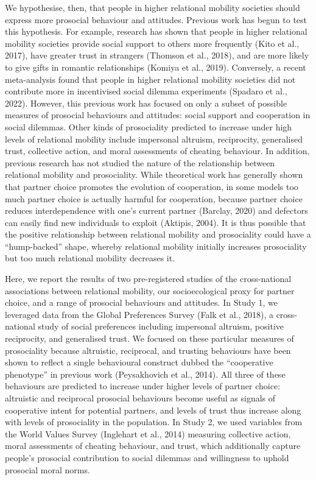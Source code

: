 \documentclass[
  man,floatsintext]{apa6}
\begin{document}
We hypothesise, then, that people in higher relational mobility societies should express more prosocial behaviour and attitudes. Previous work has begun to test this hypothesis. For example, research has shown that people in higher relational mobility societies provide social support to others more frequently (Kito et al., 2017), have greater trust in strangers (Thomson et al., 2018), and are more likely to give gifts in romantic relationships (Komiya et al., 2019). Conversely, a recent meta-analysis found that people in higher relational mobility societies did not contribute more in incentivised social dilemma experiments (Spadaro et al., 2022). However, this previous work has focused on only a subset of possible measures of prosocial behaviours and attitudes: social support and cooperation in social dilemmas. Other kinds of prosociality predicted to increase under high levels of relational mobility include impersonal altruism, reciprocity, generalised trust, collective action, and moral assessments of cheating behaviour. In addition, previous research has not studied the nature of the relationship between relational mobility and prosociality. While theoretical work has generally shown that partner choice promotes the evolution of cooperation, in some models too much partner choice is actually harmful for cooperation, because partner choice reduces interdependence with one's current partner (Barclay, 2020) and defectors can easily find new individuals to exploit (Aktipis, 2004). It is thus possible that the positive relationship between relational mobility and prosociality could have a ``hump-backed'' shape, whereby relational mobility initially increases prosociality but too much relational mobility decreases it.

Here, we report the results of two pre-registered studies of the cross-national associations between relational mobility, our socioecological proxy for partner choice, and a range of prosocial behaviours and attitudes. In Study 1, we leveraged data from the Global Preferences Survey (Falk et al., 2018), a cross-national study of social preferences including impersonal altruism, positive reciprocity, and generalised trust. We focused on these particular measures of prosociality because altruistic, reciprocal, and trusting behaviours have been shown to reflect a single behavioural construct dubbed the ``cooperative phenotype'' in previous work (Peysakhovich et al., 2014). All three of these behaviours are predicted to increase under higher levels of partner choice: altruistic and reciprocal prosocial behaviours become useful as signals of cooperative intent for potential partners, and levels of trust thus increase along with levels of prosociality in the population. In Study 2, we used variables from the World Values Survey (Inglehart et al., 2014) measuring collective action, moral assessments of cheating behaviour, and trust, which additionally capture people's prosocial contribution to social dilemmas and willingness to uphold prosocial moral norms.
\end{document}
